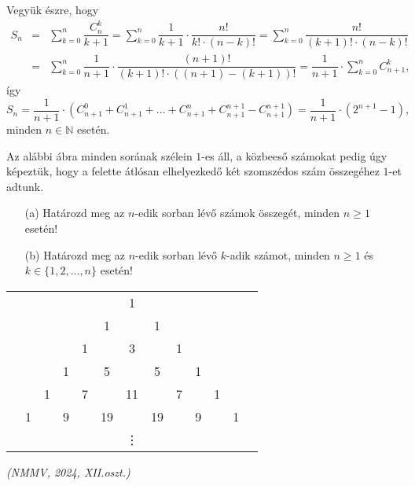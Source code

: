 \begin{solution}
Vegyük észre, hogy 
\[
\begin{array}{lcl}
S_{n} & = & \sum_{k=0}^{n}\dfrac{C_{n}^{k}}{k+1}=\sum_{k=0}^{n}\dfrac{1}{k+1}\cdot\dfrac{n!}{k!\cdot(n-k)!}=\sum_{k=0}^{n}\dfrac{n!}{(k+1)!\cdot(n-k)!}\\
 & = & \sum_{k=0}^{n}\dfrac{1}{n+1}\cdot\dfrac{(n+1)!}{(k+1)!\cdot((n+1)-(k+1))!}=\dfrac{1}{n+1}\cdot\sum_{k=0}^{n}C_{n+1}^{k},
\end{array}
\]
így 
\[
S_{n}=\dfrac{1}{n+1}\cdot(C_{n+1}^{0}+C_{n+1}^{1}+\ldots+C_{n+1}^{n}+C_{n+1}^{n+1}-C_{n+1}^{n+1})=\dfrac{1}{n+1}\cdot(2^{n+1}-1),
\]
minden $n\in\mathbb{N}$ esetén. 
\end{solution}
\begin{extraproblem}
Az alábbi ábra minden sorának szélein $1$-es áll, a közbeeső számokat
pedig úgy képeztük, hogy a felette átlósan elhelyezkedő két szomszédos
szám összegéhez $1$-et adtunk. 
\begin{itemize}
\item[(a)] Határozd meg az $n$-edik sorban lévő számok összegét, minden $n\ge1$
esetén! 
\item[(b)] Határozd meg az $n$-edik sorban lévő $k$-adik számot, minden $n\ge1$
és $k\in\{1,2,\dots,n\}$ esetén! 
\end{itemize}
\begin{center}
\begin{tabular}{ccccccccccccc}
 &  &  &  &  &  & 1 &  &  &  &  &  & \tabularnewline
 &  &  &  &  & 1 &  & 1 &  &  &  &  & \tabularnewline
 &  &  &  & 1 &  & 3 &  & 1 &  &  &  & \tabularnewline
 &  &  & 1 &  & 5 &  & 5 &  & 1 &  &  & \tabularnewline
 &  & 1 &  & 7 &  & 11 &  & 7 &  & 1 &  & \tabularnewline
 & 1 &  & 9 &  & 19 &  & 19 &  & 9 &  & 1 & \tabularnewline
 &  &  &  &  &  & \vdots &  &  &  &  &  & \tabularnewline
\end{tabular}
\par\end{center}
\begin{flushright}
\emph{(NMMV, 2024, XII.oszt.) }
\par\end{flushright}
\end{extraproblem}


